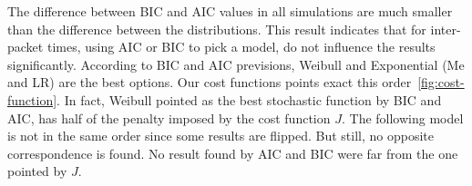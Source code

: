 The difference between BIC and AIC values in all simulations are much smaller than the difference between the distributions. This result indicates that for inter-packet times, using AIC or BIC to pick a model, do not influence the results significantly. According to BIC and AIC previsions, Weibull and Exponential (Me and LR) are the best options. Our cost functions points exact this order~\ref{fig:cost-function}. In fact, Weibull pointed as the best stochastic function by BIC and AIC, has half of the penalty imposed by the cost function $J$. The following model is not in the same order since some results are flipped. But still, no opposite correspondence is found. No result found by AIC and BIC were far from the one pointed by $J$. 
















